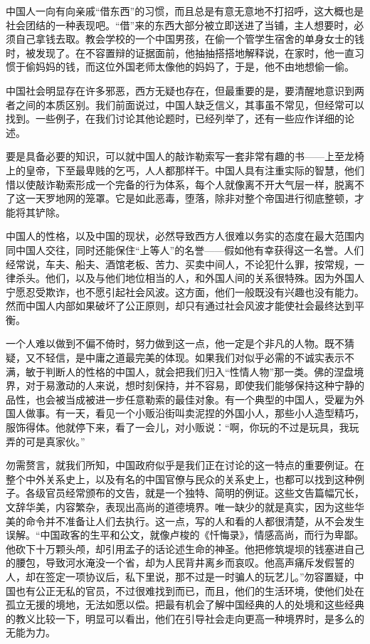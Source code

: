 \documentclass[12pt,oneside]{book}
\begin{document}
\begin{common-format}
中国人一向有向亲戚“借东西”的习惯，而且总是有意无意地不打招呼，这大概也是社会团结的一种表现吧。“借”来的东西大部分被立即送进了当铺，主人想要时，必须自己拿钱去取。教会学校的一个中国男孩，在偷一个管学生宿舍的单身女士的钱时，被发现了。在不容置辩的证据面前，他抽抽搭搭地解释说，在家时，他一直习惯于偷妈妈的钱，而这位外国老师太像他的妈妈了，于是，他不由地想偷一偷。 

中国社会明显存在许多邪恶，西方无疑也存在，但最重要的是，要清醒地意识到两者之间的本质区别。我们前面说过，中国人缺乏信义，其事虽不常见，但经常可以找到。一些例子，在我们讨论其他论题时，已经列举了，还有一些应作详细的论述。 

要是具备必要的知识，可以就中国人的敲诈勒索写一套非常有趣的书——上至龙椅上的皇帝，下至最卑贱的乞丐，人人都那样干。中国人具有注重实际的智慧，他们惜以使敲诈勒索形成一个完备的行为体系，每个人就像离不开大气层一样，脱离不了这一天罗地网的笼罩。它是如此恶毒，堕落，除非对整个帝国进行彻底整顿，才能将其铲除。 

中国人的性格，以及中国的现状，必然导致西方人很难以务实的态度在最大范围内同中国人交往，同时还能保住“上等人”的名誉——假如他有幸获得这一名誉。人们经常说，车夫、船夫、酒馆老板、苦力、买卖中间人，不论犯什么罪，按常规，一律杀头。他们，以及与他们地位相当的人，和外国人间的关系很特殊。因为外国人宁愿忍受欺诈，也不愿引起社会风波。这方面，他们一般既没有兴趣也没有能力。然而中国人内部如果破坏了公正原则，却只有通过社会风波才能使社会最终达到平衡。 

一个人难以做到不偏不倚时，努力做到这一点，他一定是个非凡的人物。既不猜疑，又不轻信，是中庸之道最完美的体现。如果我们对似乎必需的不诚实表示不满，敏于判断人的性格的中国人，就会把我们归入“性情人物”那一类。佛的涅盘境界，对于易激动的人来说，想时刻保持，并不容易，即使我们能够保持这种宁静的品性，也会被当成被进一步任意勒索的最佳对象。有一个典型的中国人，受雇为外国人做事。有一天，看见一个小贩沿街叫卖泥捏的外国小人，那些小人造型精巧，服饰得体。他就停下来，看了一会儿，对小贩说：“啊，你玩的不过是玩具，我玩弄的可是真家伙。” 

勿需赘言，就我们所知，中国政府似乎是我们正在讨论的这一特点的重要例证。在整个中外关系史上，以及有名的中国官僚与民众的关系史上，也都可以找到这种例子。各级官员经常颁布的文告，就是一个独特、简明的例证。这些文告篇幅冗长，文辞华美，内容繁杂，表现出高尚的道德境界。唯一缺少的就是真实，因为这些华美的命令并不准备让人们去执行。这一点，写的人和看的人都很清楚，从不会发生误解。“中国政客的生平和公文，就像卢梭的《忏悔录》，情感高尚，而行为卑鄙。他砍下十万颗头颅，却引用孟子的话论述生命的神圣。他把修筑堤坝的钱塞进自己的腰包，导致河水淹没一个省，却为人民背井离乡而哀叹。他高声痛斥发假誓的人，却在签定一项协议后，私下里说，那不过是一时骗人的玩艺儿。”勿容置疑，中国也有公正无私的官员，不过很难找到而已，而且，他们的生活环境，使他们处在孤立无援的境地，无法如愿以偿。把最有机会了解中国经典的人的处境和这些经典的教义比较一下，明显可以看出，他们在引导社会走向更高一种境界时，是多么的无能为力。 


\end{common-format}
\end{document}
